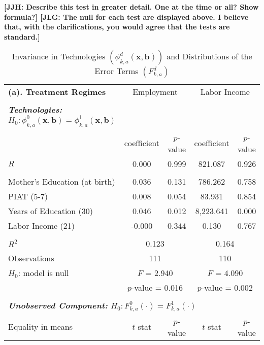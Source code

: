 \noindent \textbf{[JJH: Describe this test in greater detail. One at the time or all? Show formula?] [JLG: The null for each test are displayed above. I believe that, with the clarifications, you would agree that the tests are standard.]}

\setcounter{table}{1}

\begin{table}[!htpb]
\begin{threeparttable}
\caption{Invariance in Technologies $ \left( \phi_{k,a}^d \left( \bm{x}, \bm{b} \right) \right) $ and Distributions of the  Error Terms $\left( F_{k,a}^d \right) $} \label{table:invariance}
\centering
\footnotesize
\begin{tabular}{lcccc} \toprule
 \multicolumn{1}{l}{\textbf{(a). Treatment Regimes}} & \multicolumn{2}{c}{Employment} &   \multicolumn{2}{c}{Labor Income} \\ \\
 \textbf{\textit{Technologies:} $H_0: \phi_{k,a}^0 \left( \bm{x}, \bm{b} \right) = \phi_{k,a}^1 \left( \bm{x}, \bm{b} \right)$}      \\
       			      & coefficient & $p$-value & coefficient & $p$-value \\
$R$ &0.000 & 0.999 & 821.087 & 0.926 \\ \\
Mother's Education (at birth) & 0.036 & 0.131 & 786.262 & 0.758 \\
PIAT (5-7) & 0.008 & 0.054 & 83.931 & 0.854 \\
Years of Education (30) & 0.046 & 0.012 & 8,223.641 & 0.000 \\
Labor Income (21) & -0.000 & 0.344 & 0.130 & 0.767 \\ \\
$R^2$ & \multicolumn{2}{c}{0.123}  & \multicolumn{2}{c}{0.164}  \\
Observations & \multicolumn{2}{c}{111} & \multicolumn{2}{c}{110} \\ 
$H_0$: model is null & \multicolumn{2}{c}{$F$ = 2.940} & \multicolumn{2}{c}{$F$ = 4.090} \\ 
& \multicolumn{2}{c}{$p$-value = 0.016} & \multicolumn{2}{c}{$p$-value = 0.002} \\ \\
 \multicolumn{5}{l}{\textbf{\textit{Unobserved Component:} $H_0:  F_{k,a}^0 \left( \cdot \right) =  F_{k,a}^1 \left( \cdot \right)$}} \\  
Equality in means & $t$-stat & $p$-value & $t$-stat & $p$-value \\

\end{tabular}
\end{threeparttable}
\end{table}
